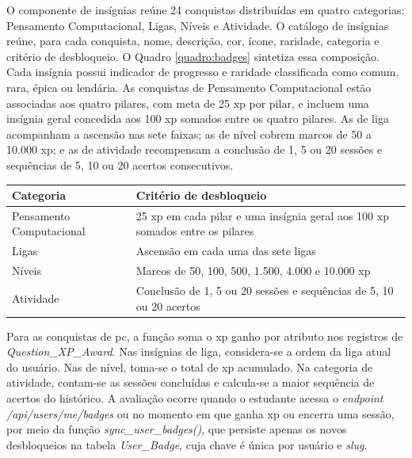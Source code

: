 O componente de insígnias reúne 24 conquistas distribuídas em quatro
categorias: Pensamento Computacional, Ligas, Níveis e Atividade. O catálogo de insígnias
reúne, para cada conquista, nome,
descrição, cor, ícone, raridade, categoria e critério de desbloqueio. O Quadro
\ref{quadro:badges} sintetiza essa composição. Cada insígnia possui indicador de
progresso e raridade classificada como comum, rara, épica ou lendária. As
conquistas de Pensamento Computacional estão associadas aos quatro pilares, com
meta de 25 \gls{xp} por pilar, e incluem uma insígnia geral concedida aos 100
\gls{xp} somados entre os quatro pilares. As de liga acompanham a ascensão nas sete faixas; as de nível cobrem
marcos de 50 a 10.000 \gls{xp}; e as de atividade recompensam a conclusão de 1, 5
ou 20 sessões e sequências de 5, 10 ou 20 acertos consecutivos.

\begin{quadro}[H]
    \centering
    \caption{\label{quadro:badges}Composição do catálogo de insígnias}
    \begin{tabular}{|l|p{9cm}|}
        \hline
        \textbf{Categoria} & \textbf{Critério de desbloqueio} \\ \hline
        Pensamento Computacional & 25 \gls{xp} em cada pilar e uma insígnia geral aos 100 \gls{xp} somados entre os pilares \\ \hline
        Ligas & Ascensão em cada uma das sete ligas \\ \hline
        Níveis & Marcos de 50, 100, 500, 1.500, 4.000 e 10.000 \gls{xp} \\ \hline
        Atividade & Conclusão de 1, 5 ou 20 sessões e sequências de 5, 10 ou 20 acertos \\ \hline
    \end{tabular}
\end{quadro}

Para as conquistas de \gls{pc}, a função soma
o \gls{xp} ganho por atributo nos registros de \textit{Question\_XP\_Award}. Nas
insígnias de liga, considera-se a ordem da liga atual do usuário. Nas de nível,
toma-se o total de \gls{xp} acumulado. Na categoria de atividade, contam-se as
sessões concluídas e calcula-se a maior sequência de acertos do histórico. A
avaliação ocorre quando o estudante acessa o \textit{endpoint}
\textit{/api/users/me/badges} ou no momento em que ganha \gls{xp} ou encerra uma
sessão, por meio da função \textit{sync\_user\_badges()}, que persiste apenas os
novos desbloqueios na tabela \textit{User\_Badge}, cuja chave é única por
usuário e \textit{slug}.

